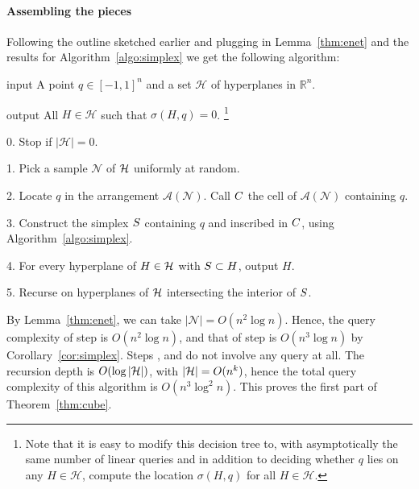 \paragraph{Assembling the pieces}
Following the outline sketched earlier and plugging in
Lemma~\ref{thm:enet} and
the results for
Algorithm~\ref{algo:simplex} we get the following algorithm:
%
\begin{algorithm}\label{algo:meiser}
\item[input] A point \(q \in {[-1,1]}^n\) and a set \(\mathcal{H}\) of hyperplanes in \(\mathbb{R}^n\).
\item[output] All \(H \in \mathcal{H}\) such that \(\sigma(H,q) = 0\).%
\footnote{%
Note that it is easy to modify this decision tree to,
%
with asymptotically the same number of linear queries
%
and
%
in addition to deciding whether \(q\) lies on any \(H \in \mathcal{H}\),
%
compute the location \(\sigma(H,q)\) for all \(H \in \mathcal{H}\).%
}
\item[0.] Stop if \(| \mathcal{H} | = 0\).
\item[1.] Pick a sample \(\mathcal{N}\) of $\mathcal{H}$ uniformly at random.
\item[2.] Locate $q$ in the arrangement \(\mathcal{A}(\mathcal{N})\). Call
	$C$ the cell of \(\mathcal{A}(\mathcal{N})\) containing $q$.
\item[3.] Construct the simplex \(S\) containing \(q\) and inscribed in
\(C\), using Algorithm~\ref{algo:simplex}.
\item[4.]
For every hyperplane of $H \in \mathcal{H}$ with $S \subset H$, output
	\(H\).
\item[5.] Recurse on hyperplanes of $\mathcal{H}$ intersecting the interior of $S$.
\end{algorithm}

By Lemma~\ref{thm:enet}, we can take \(| \mathcal{N} | = O(n^2 \log n)\).
Hence, the query complexity of step  is $O(n^2 \log n)$, and that of step
 is $O(n^3 \log n)$ by Corollary~\ref{cor:simplex}.
%
Steps ,  and  do not involve any
query at all.
%
The recursion depth is $O(\log |{\mathcal{H}}|)$, with $|\mathcal{H}|=O(n^k)$,
hence the total query complexity of this algorithm is $O(n^3 \log^2 n)$.
%
This proves the first part of Theorem~\ref{thm:cube}.

